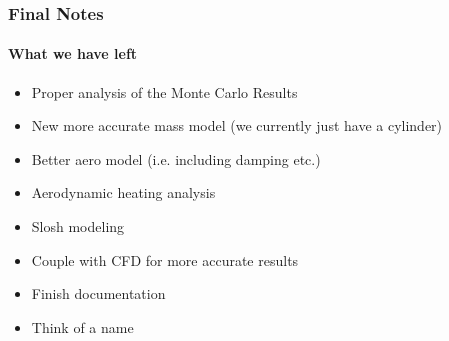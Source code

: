 \documentclass{beamer}
\begin{document}
    \begin{frame}
        \frametitle{Final Notes}
        \framesubtitle{What we have left}
        \begin{itemize}
            \item Proper analysis of the Monte Carlo Results
            \item New more accurate mass model (we currently just have a cylinder)
            \item Better aero model (i.e. including damping etc.)
            \item Aerodynamic heating analysis
            \item Slosh modeling
            \item Couple with CFD for more accurate results 
            \item Finish documentation
            \item Think of a name
        \end{itemize} 
    \end{frame}
\end{document}
